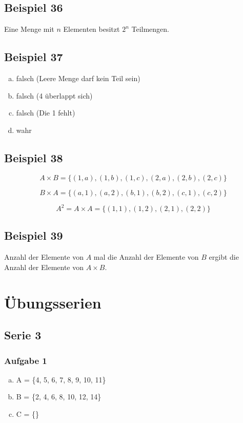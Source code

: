 \documentclass[12pt, a4paper, oneside]{article}
\begin{document}
\subsection{Beispiel 36}
Eine Menge mit $n$ Elementen besitzt $2^{n}$ Teilmengen.

\subsection{Beispiel 37}
\begin{enumerate}[(a)]
  \item falsch (Leere Menge darf kein Teil sein)
  \item falsch (4 überlappt sich)
  \item falsch (Die 1 fehlt)
  \item wahr
\end{enumerate}

\subsection{Beispiel 38}
\begin{equation}
  A \times B = \{(1, a), (1, b), (1, c), (2, a), (2, b), (2, c)\} 
\end{equation}

\begin{equation}
  B \times A = \{(a, 1), (a, 2), (b, 1), (b, 2), (c, 1), (c, 2)\}
\end{equation}

\begin{equation}
  A^{2} = A \times A = \{(1, 1), (1, 2), (2, 1), (2, 2)\}
\end{equation}

\subsection{Beispiel 39}
Anzahl der Elemente von $A$ mal die Anzahl der Elemente von $B$ ergibt die Anzahl der Elemente von $A \times B$.


\newpage
\section{Übungsserien}
\subsection{Serie 3}
\subsubsection{Aufgabe 1}
\begin{enumerate}[(a)]
  \item A = \{4, 5, 6, 7, 8, 9, 10, 11\}
  \item B = \{2, 4, 6, 8, 10, 12, 14\}
  \item C = \{\}
\end{enumerate}
\end{document}
